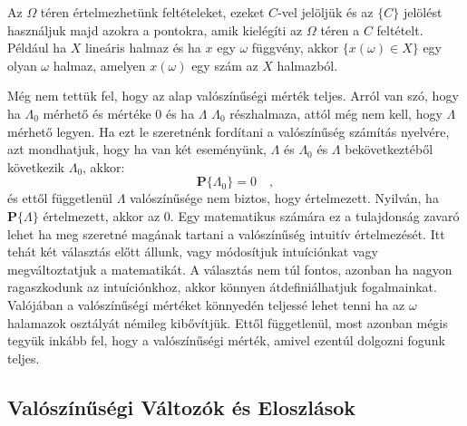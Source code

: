 \documentclass{article}
\begin{document}
Az $\Omega$ téren értelmezhetünk feltételeket, ezeket $C$-vel jelöljük és az $\{C\}$ jelölést használjuk majd azokra a pontokra, amik kielégíti az $\Omega$ téren a $C$ feltételt. Például ha $X$ lineáris halmaz és ha $x$ egy $\omega$ függvény, akkor $\{x(\omega) \in X\}$ egy olyan $\omega$ halmaz, amelyen $x(\omega)$ egy szám az $X$ halmazból.

Még nem tettük fel, hogy az alap valószínűségi mérték teljes. Arról van szó, hogy ha $\Lambda_0$ mérhető és mértéke $0$ és ha $\Lambda$ $\Lambda_0$ részhalmaza, attól még nem kell, hogy $\Lambda$ mérhető legyen. Ha ezt le szeretnénk fordítani a valószínűség számítás nyelvére, azt mondhatjuk, hogy ha van két eseményünk, $\Lambda$ és $\Lambda_0$ és $\Lambda$ bekövetkeztéből következik $\Lambda_0$, akkor:
\begin{equation}
\mathbf{P}\{\Lambda_0\} = 0 \quad ,
\end{equation}
és ettől függetlenül $\Lambda$ valószínűsége nem biztos, hogy értelmezett. Nyilván, ha $\mathbf{P}\{\Lambda\}$ értelmezett, akkor az $0$. Egy matematikus számára ez a tulajdonság zavaró lehet ha meg szeretné magának tartani a valószínűség intuitív értelmezését. Itt tehát két választás előtt állunk, vagy módosítjuk intuíciónkat vagy megváltoztatjuk a matematikát. A választás nem túl fontos, azonban ha nagyon ragaszkodunk az intuíciónkhoz, akkor könnyen átdefiniálhatjuk fogalmainkat. Valójában a valószínűségi mértéket könnyedén teljessé lehet tenni ha az $\omega$ halamazok osztályát némileg kibővítjük. Ettől függetlenül, most azonban mégis tegyük inkább fel, hogy a valószínűségi mérték, amivel ezentúl dolgozni fogunk teljes.

\subsection{Valószínűségi Változók és Eloszlások}\label{ss:vveelo}
\end{document}
